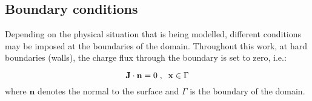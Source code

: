 \subsection{Boundary conditions}
Depending on the physical situation that is being modelled, different
conditions may be imposed at the boundaries of the domain. Throughout
this work, at hard boundaries (walls), the charge flux through the
boundary is set to zero, i.e.:

\begin{equation}\label{eq:et:j0}
\mathbf{J} \cdot \mathbf{n} = 0 \;,\;\; \mathbf{x} \in \Gamma
\end{equation}
where $\mathbf{n}$ denotes the normal to the surface and $\Gamma$ is
the boundary of the domain. 





